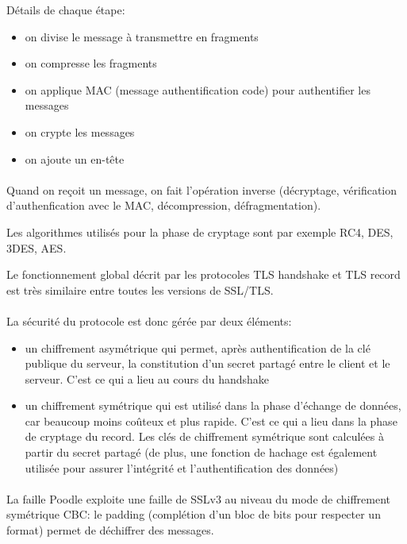 Détails de chaque étape:
\begin{itemize}
\item on divise le message à transmettre en fragments 
\item on compresse les fragments
\item on applique MAC (message authentification code) pour authentifier les messages 
\item on crypte les messages
\item on ajoute un en-t\^ete
\end{itemize}

\paragraph{}
Quand on reçoit un message, on fait l'opération inverse (décryptage, vérification d'authenfication avec le MAC, décompression, défragmentation). 

Les algorithmes utilisés pour la phase de cryptage sont par exemple RC4, DES, 3DES, AES. 

Le fonctionnement global décrit par les protocoles TLS handshake et TLS record est très similaire entre toutes les versions de SSL/TLS. 

\paragraph{}
La sécurité du protocole est donc gérée par deux éléments:
\begin{itemize}
\item un chiffrement asymétrique qui permet, après authentification de la clé publique du serveur, la constitution d'un secret partagé entre le client et le serveur. C'est ce qui a lieu au cours du handshake
\item un chiffrement symétrique qui est utilisé dans la phase d'échange de données, car beaucoup moins coûteux et plus rapide. C'est ce qui a lieu dans la phase de cryptage du record. Les clés de chiffrement symétrique sont calculées à partir du secret partagé (de plus, une fonction de hachage est également utilisée pour assurer l'intégrité et l'authentification des données)
\end{itemize}

\paragraph{}
La faille Poodle exploite une faille de SSLv3 au niveau du mode de chiffrement symétrique CBC: le padding (complétion d'un bloc de bits pour respecter un format) permet de déchiffrer des messages. 


